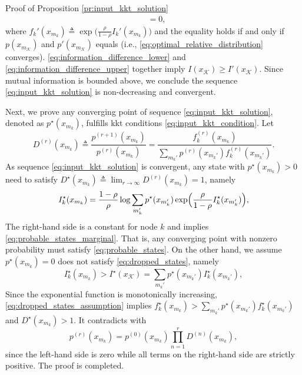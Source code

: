 \documentclass[journal]{IEEEtran}
\begin{document}
\begin{appendix}
\begin{subsection}{Proof of Proposition \ref{pr:input_kkt_solution}}
\begin{subequations}
\begin{align}
				 & = 0,
			\end{align}
		\end{subequations}
		where $f_k'(x_{m_k}) \triangleq \exp \bigl( \frac{\rho}{1 - \rho} I_k'(x_{m_k}) \bigr)$ and the equality holds if and only if $p(x_{m_{\mathcal{K}}})$ and $p'(x_{m_{\mathcal{K}}})$ equals (i.e., \eqref{eq:optimal_relative_distribution} converges).
		\eqref{eq:information_difference_lower} and \eqref{eq:information_difference_upper} together imply $I(x_{\mathcal{K}}) \ge I'(x_{\mathcal{K}})$.
		Since mutual information is bounded above, we conclude the sequence \eqref{eq:input_kkt_solution} is non-decreasing and convergent.

		Next, we prove any converging point of sequence \eqref{eq:input_kkt_solution}, denoted as $p^\star(x_{m_k})$, fulfills \gls{kkt} conditions \eqref{eq:input_kkt_condition}.
		Let
		\begin{equation}
			D^{(r)}(x_{m_k}) \triangleq \frac{p^{(r+1)}(x_{m_k})}{p^{(r)}(x_{m_k})} = \frac{f_k^{(r)}(x_{m_k})}{\sum_{m_k'} p^{(r)}(x_{m_k'}) f_k^{(r)}(x_{m_k'})}.
		\end{equation}
		As sequence \eqref{eq:input_kkt_solution} is convergent, any state with $p^\star(x_{m_k}) > 0$ need to satisfy $D^\star(x_{m_k}) \triangleq \lim_{r \to \infty} D^{(r)}(x_{m_k}) = 1$, namely
		\begin{equation}
			I_k^\star(x_{m_k}) = \frac{1 - \rho}{\rho} \log \sum_{m_k'} p^\star(x_{m_k'}) \exp \Bigl( \frac{\rho}{1 - \rho} I_k^\star(x_{m_k'}) \Bigr),
		\end{equation}
		The right-hand side is a constant for node $k$ and implies \eqref{eq:probable_states_marginal}.
		That is, any converging point with nonzero probability must satisfy \eqref{eq:probable_states}.
		On the other hand, we assume $p^\star(x_{m_k}) = 0$ does not satisfy \eqref{eq:dropped_states}, namely
		\begin{equation}
			I_k^\star(x_{m_k}) > I^\star(x_{\mathcal{K}}) = \sum_{m_k'} p^\star(x_{m_k'}) I_k^\star(x_{m_k'}),
			\label{eq:dropped_states_assumption}
		\end{equation}
		Since the exponential function is monotonically increasing, \eqref{eq:dropped_states_assumption} implies $f_k^\star(x_{m_k}) > \sum_{m_k'} p^\star(x_{m_k'}) f_k^\star(x_{m_k'})$ and $D^\star(x_{m_k}) > 1$.
		It contradicts with
		\begin{equation}
			p^{(r)}(x_{m_k}) = p^{(0)}(x_{m_k}) \prod_{n=1}^r D^{(n)}(x_{m_k}),
		\end{equation}
		since the left-hand side is zero while all terms on the right-hand side are strictly positive.
		The proof is completed.
		\label{ap:input_kkt_solution}
	\end{subsection}


\end{appendix}
\end{document}
